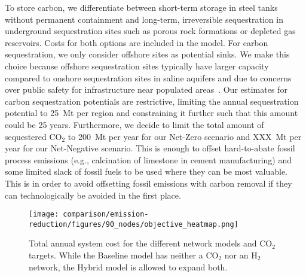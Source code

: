 \documentclass[twocolumn]{article}
\newcommand{\COtwo}{CO$_2$}
\newcommand{\Htwo}{H$_2$}
\newcommand{\modBase}{Baseline model}
\newcommand{\modHybrid}{Hybrid model}
\begin{document}

To store carbon, we differentiate between short-term storage in steel tanks without permanent containment and long-term, irreversible sequestration in underground sequestration sites such as porous rock formations or depleted gas reservoirs.
Costs for both options are included in the model.
For carbon sequestration, we only consider offshore sites as potential sinks.
We make this choice because offshore sequestration sites typically have larger capacity compared to onshore sequestration sites in saline aquifers and due to concerns over public safety for infrastructure near populated areas~\cite{TODO}.
Our estimates for carbon sequestration potentials are restrictive, limiting the annual sequestration potential to 25~Mt per region and constraining it further such that this amount could be  25 years.
Furthermore, we decide to limit the total amount of sequestered \COtwo{} to 200~Mt per year for our Net-Zero scenario and XXX~Mt per year for our Net-Negative scenario.
This is enough to offset hard-to-abate fossil process emissions (e.g., calcination of limestone in cement manufacturing) and some limited slack of fossil fuels to be used where they can be most valuable.
This is in order to avoid offsetting fossil emissions with carbon removal if they can technologically be avoided in the first place.


\printbibliography

\appendix




\begin{figure}
    \centering
    \texttt{[image: comparison/emission-reduction/figures/90\_nodes/objective\_heatmap.png]}
    \caption{Total annual system cost for the different network models and \COtwo{} targets. While the \modBase{} has neither a \COtwo{} nor an \Htwo{} network, the \modHybrid{} is allowed to expand both.}
    \label{fig:objective_heatmap}
\end{figure}
\end{document}
